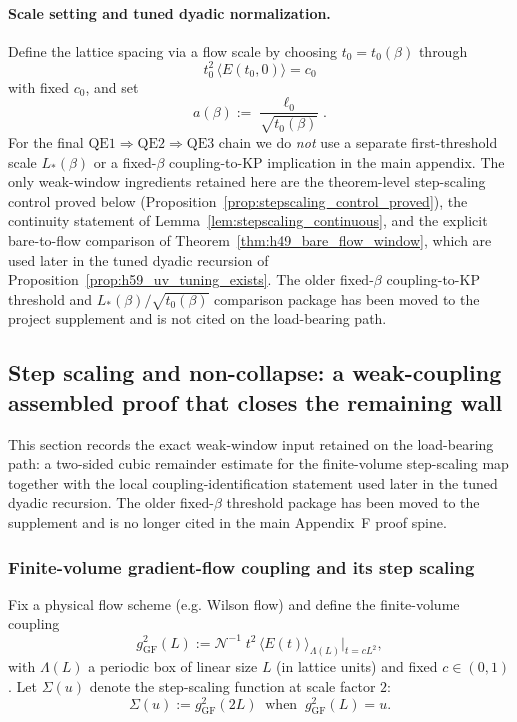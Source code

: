 \paragraph{Scale setting and tuned dyadic normalization.}
Define the lattice spacing via a flow scale by choosing $t_0=t_0(\beta)$ through
\begin{equation}\label{eq:t0_def}
 t_0^2\,\langle E(t_0,0)\rangle = c_0
\end{equation}
with fixed $c_0$, and set
\begin{equation}\label{eq:a_from_t0}
 a(\beta):=\frac{\ell_0}{\sqrt{t_0(\beta)}}.
\end{equation}
For the final $\mathrm{QE1}\Rightarrow\mathrm{QE2}\Rightarrow\mathrm{QE3}$ chain we do \emph{not} use a separate first-threshold scale $L_*(\beta)$ or a fixed-$\beta$ coupling-to-KP implication in the main appendix.
The only weak-window ingredients retained here are the theorem-level step-scaling control proved below (Proposition~\ref{prop:stepscaling_control_proved}), the continuity statement of Lemma~\ref{lem:stepscaling_continuous}, and the explicit bare-to-flow comparison of Theorem~\ref{thm:h49_bare_flow_window}, which are used later in the tuned dyadic recursion of Proposition~\ref{prop:h59_uv_tuning_exists}.
The older fixed-$\beta$ coupling-to-KP threshold and $L_*(\beta)/\sqrt{t_0(\beta)}$ comparison package has been moved to the project supplement and is not cited on the load-bearing path.

\subsection{Step scaling and non-collapse: a weak-coupling assembled proof that closes the remaining wall}
\label{sec:stepscaling_proof}

This section records the exact weak-window input retained on the load-bearing path: a two-sided cubic remainder estimate for the finite-volume step-scaling map together with the local coupling-identification statement used later in the tuned dyadic recursion.
The older fixed-$\beta$ threshold package has been moved to the supplement and is no longer cited in the main Appendix~F proof spine.

\subsubsection{Finite-volume gradient-flow coupling and its step scaling}
Fix a physical flow scheme (e.g. Wilson flow) and define the finite-volume coupling
\begin{equation}\label{eq:F_gf_coupling_def}
 g^2_{\mathrm{GF}}(L) := \mathcal N^{-1} \; t^2\,\langle E(t)\rangle_{\Lambda(L)}\Big|_{t=c L^2},
\end{equation}
with $\Lambda(L)$ a periodic box of linear size $L$ (in lattice units) and fixed $c\in(0,1)$.
Let $\Sigma(u)$ denote the step-scaling function at scale factor $2$:
\begin{equation}\label{eq:stepscaling_def}
\Sigma(u):= g^2_{\mathrm{GF}}(2L)\ \text{ when }\ g^2_{\mathrm{GF}}(L)=u.
\end{equation}

